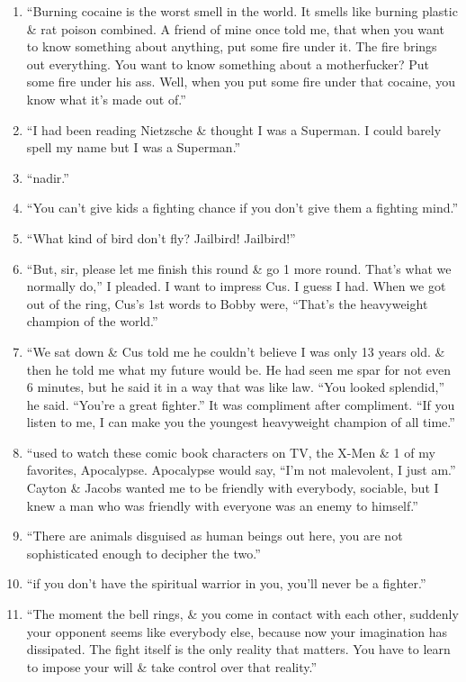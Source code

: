 \documentclass{article}
\numberwithin{equation}{section}
\begin{document}
\begin{enumerate}
	\item ``Burning cocaine is the worst smell in the world. It smells like burning plastic \& rat poison combined. A friend of mine once told me, that when you want to know something about anything, put some fire under it. The fire brings out everything. You want to know something about a motherfucker? Put some fire under his ass. Well, when you put some fire under that cocaine, you know what it's made out of.''
	\item ``I had been reading Nietzsche \& thought I was a Superman. I could barely spell my name but I was a Superman.''
	\item ``nadir.''
	\item ``You can't give kids a fighting chance if you don't give them a fighting mind.''
	\item ``What kind of bird don't fly? Jailbird! Jailbird!''
	\item ``But, sir, please let me finish this round \& go 1 more round. That's what we normally do,'' I pleaded. I want to impress Cus. I guess I had. When we got out of the ring, Cus's 1st words to Bobby were, ``That's the heavyweight champion of the world.''
	\item ``We sat down \& Cus told me he couldn't believe I was only 13 years old. \& then he told me what my future would be. He had seen me spar for not even 6  minutes, but he said it in a way that was like law. ``You looked splendid,'' he said. ``You're a great fighter.'' It was compliment after compliment. ``If you listen to me, I can make you the youngest heavyweight champion of all time.''
	\item ``used to watch these comic book characters on TV, the X-Men \& 1 of my favorites, Apocalypse. Apocalypse would say, ``I'm not malevolent, I just am.'' Cayton \& Jacobs wanted me to be friendly with everybody, sociable, but I knew a man who was friendly with everyone was an enemy to himself.''
	\item ``There are animals disguised as human beings out here, you are not sophisticated enough to decipher the two.''
	\item ``if you don't have the spiritual warrior in you, you'll never be a fighter.''
	\item ``The moment the bell rings, \& you come in contact with each other, suddenly your opponent seems like everybody else, because now your imagination has dissipated. The fight itself is the only reality that matters. You have to learn to impose your will \& take control over that reality.''

\end{enumerate}
\end{document}
